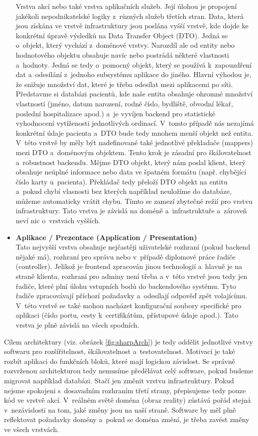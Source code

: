 \begin{itemize}
	Vrstva akcí nebo také vrstva aplikačních služeb. Její úlohou je propojení jakékoli nepodnikatelské logiky z~různých služeb třetích stran. Data, která jsou získána ve vrstvě infrastruktury jsou poslána vyšší vrstvě, kde dojde ke konkrétní úpravě výsledků na Data Transfer Object (DTO). Jedná se o~objekt, který vychází z~doménové vrstvy. Narozdíl ale od entity nebo hodnotového objektu obsahuje navíc nebo postrádá některé vlastnosti a~hodnoty. Jedná se tedy o~pomocný objekt, který se používá k~zapouzdření dat a~odesílání z~jednoho subsystému aplikace do jiného. Hlavní výhodou je, že snižuje množství dat, které je třeba odesílat mezi aplikacemi po síti. Představme si databázi pacientů, kde naše entita obsahuje ohromné množství vlastností (jméno, datum narození, rodné číslo, bydliště, obvodní lékař, poslední hospitalizace apod.) a~je vyvíjen backend pro statistické vyhodnocení vytíženosti jednotlivých ordinací. V~tomto případě nás nezajímá konkrétní údaje pacienta a~DTO bude tedy mnohem menší objekt než entita. V~této vrstvě by měly být nadefinované také jednotlivé překladače (mappers) mezi DTO a~doménovým objektem. Tento krok je zásadní pro škálovatelnost a~robustnost backendu. Mějme DTO objekt, který nám poslal klient, který obsahuje neúplné informace nebo data ve špatném formátu (např. chybějící číslo karty u~pacienta). Překládač tedy přeloží DTO objekt na entitu a~pokud chybí vlasnosti bez kterých například neuložíme do databáze, můžeme automaticky vrátit chybu. Tímto se zamezí zbytečné režií pro vrstvu infrastruktury. Tato vrstva je závislá na doméně a~infrastruktuře a~zároveň neví nic o~vrstvách vyšších.
	\item \textbf{Aplikace / Prezentace (Application / Presentation)} \\
	Tato nejvyšší vrstva obsahuje nejčastěji uživatelské rozhraní (pokud backend nějaké má), rozhraní pro správu nebo v~případě diplomové práce řadiče (controller). Jelikož je frontend zpracován jinou technologií a~hlavně je na straně klienta, rozhraní pro adminy není třeba a v~této vrstvě jsou tedy jen řadiče, které plní úlohu vstupních bodů do backendového systému. Tyto řadiče zpracovávají příchozí požadavky a~odesílají odpověď zpět volajícímu. V~této vrstvě se také mohou nacházet konfigurační soubory specifické pro aplikaci (číslo portu, cesty k~certifikátům, přístupové údaje apod.). Tato vrstva je plně závislá na všech spodních.
\end{itemize}

Cílem architektury (viz. obrázek \ref{fig:sharpArch}) je tedy oddělit jednotlivé vrstvy softwaru pro rozšířitelnost, škálovatelnost a~testovatelnost. Motivací je také rozbít aplikaci do funkčních bloků, které mají logickou závislost. Se správně rozvrženou architekturou tedy nemusíme předělávat celý software, pokud budeme migrovat například databázi. Stačí jen změnit vrstvu infrastruktury. Pokud nejsme spokojeni s~dosavadním rozhraním třetí strany, přepisujeme tedy pouze kód ve vrstvě akcí. V~reálném světě doména (obraz reality) zůstává pořád stejná v~nezávislosti na tom, jaké změny jsou na naší straně. Software by měl plně reflektovat požadavky domény a~pokud se doména změní, je třeba zavést změny ve všech vrstvách.\cite{20} \\

